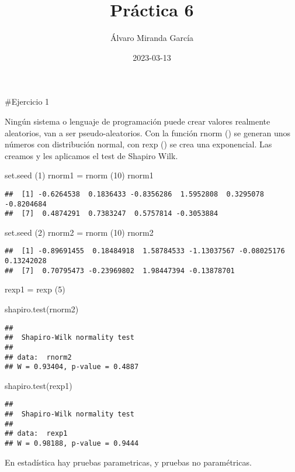 \documentclass[
]{article}
\title{Práctica 6}
\author{Álvaro Miranda García}
\date{2023-03-13}
\newenvironment{Shaded}{\begin{snugshade}}{\end{snugshade}}
\newcommand{\DecValTok}[1]{\textcolor[rgb]{0.00,0.00,0.81}{#1}}
\newcommand{\FunctionTok}[1]{\textcolor[rgb]{0.00,0.00,0.00}{#1}}
\newcommand{\NormalTok}[1]{#1}
\newcommand{\OtherTok}[1]{\textcolor[rgb]{0.56,0.35,0.01}{#1}}
\begin{document}
\maketitle

\#Ejercicio 1

Ningún sistema o lenguaje de programación puede crear valores realmente
aleatorios, van a ser pseudo-aleatorios. Con la función rnorm () se
generan unos números con distribución normal, con rexp () se crea una
exponencial. Las creamos y les aplicamos el test de Shapiro Wilk.

\begin{Shaded}
\begin{Highlighting}[]
\FunctionTok{set.seed}\NormalTok{ (}\DecValTok{1}\NormalTok{)}
\NormalTok{rnorm1 }\OtherTok{=} \FunctionTok{rnorm}\NormalTok{ (}\DecValTok{10}\NormalTok{)}
\NormalTok{rnorm1}
\end{Highlighting}
\end{Shaded}

\begin{verbatim}
##  [1] -0.6264538  0.1836433 -0.8356286  1.5952808  0.3295078 -0.8204684
##  [7]  0.4874291  0.7383247  0.5757814 -0.3053884
\end{verbatim}

\begin{Shaded}
\begin{Highlighting}[]
\FunctionTok{set.seed}\NormalTok{ (}\DecValTok{2}\NormalTok{)}
\NormalTok{rnorm2 }\OtherTok{=} \FunctionTok{rnorm}\NormalTok{ (}\DecValTok{10}\NormalTok{)}
\NormalTok{rnorm2}
\end{Highlighting}
\end{Shaded}

\begin{verbatim}
##  [1] -0.89691455  0.18484918  1.58784533 -1.13037567 -0.08025176  0.13242028
##  [7]  0.70795473 -0.23969802  1.98447394 -0.13878701
\end{verbatim}

\begin{Shaded}
\begin{Highlighting}[]
\NormalTok{rexp1 }\OtherTok{=} \FunctionTok{rexp}\NormalTok{ (}\DecValTok{5}\NormalTok{)}

\FunctionTok{shapiro.test}\NormalTok{(rnorm2)}
\end{Highlighting}
\end{Shaded}

\begin{verbatim}
## 
##  Shapiro-Wilk normality test
## 
## data:  rnorm2
## W = 0.93404, p-value = 0.4887
\end{verbatim}

\begin{Shaded}
\begin{Highlighting}[]
\FunctionTok{shapiro.test}\NormalTok{(rexp1)}
\end{Highlighting}
\end{Shaded}

\begin{verbatim}
## 
##  Shapiro-Wilk normality test
## 
## data:  rexp1
## W = 0.98188, p-value = 0.9444
\end{verbatim}

En estadística hay pruebas parametricas, y pruebas no paramétricas.
\end{document}
